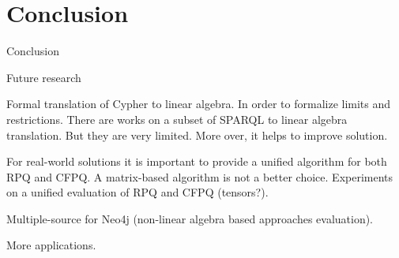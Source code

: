 \section{Conclusion}

Conclusion

Future research

Formal translation of Cypher to linear algebra.
In order to formalize limits and restrictions.
There are works on a subset of SPARQL to linear algebra translation. 
But they are very limited. 
More over, it helps to improve solution.

For real-world solutions it is important to provide a unified algorithm for both RPQ and CFPQ.
A matrix-based algorithm is not a better choice.
Experiments on a unified evaluation of RPQ and CFPQ (tensors?).

Multiple-source for Neo4j (non-linear algebra based approaches evaluation).

More applications.